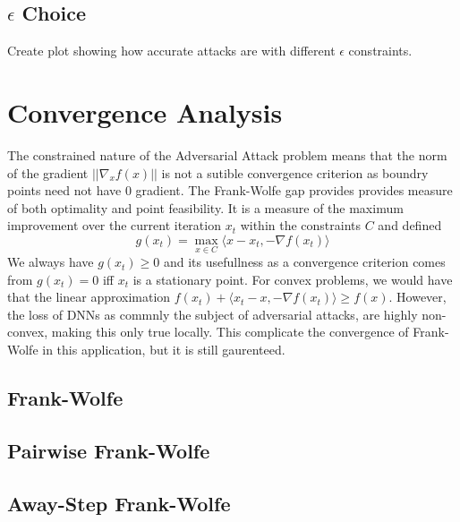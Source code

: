 \documentclass{article}
\begin{document}
\subsection{$\epsilon$ Choice}
Create plot showing how accurate attacks are with different $\epsilon$ constraints.
\section{Convergence Analysis}
The constrained nature of the Adversarial Attack problem means that the norm of the gradient $||\nabla_x f(x)||$ is not a sutible convergence criterion as boundry points need not have $0$ gradient. 
The Frank-Wolfe gap provides provides measure of both optimality and point feasibility. It is a measure of the maximum improvement over the current iteration $x_t$ within the constraints $C$ and defined
$$g(x_t) = \max_{x\in C} \langle x - x_t, -\nabla f(x_t)\rangle$$
We always have $g(x_t) \geq 0$ and its usefullness as a convergence criterion comes from $g(x_t) = 0$ iff $x_t$ is a stationary point. 
For convex problems, we would have that the linear approximation $f(x_t) + \langle x_t - x, -\nabla f(x_t) \rangle \geq f(x)$. However, the loss of DNNs as commnly the subject of adversarial attacks, are highly non-convex, making this only true locally. This complicate the convergence of Frank-Wolfe in this application, but it is still gaurenteed.

\subsection{Frank-Wolfe}
\subsection{Pairwise Frank-Wolfe}
\subsection{Away-Step Frank-Wolfe}
\end{document}
